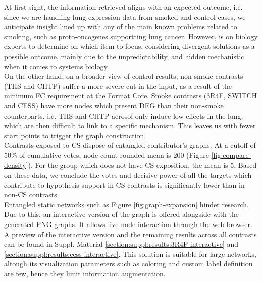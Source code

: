 At first sight, the information retrieved aligns with an expected outcome, i.e. since we are handling lung expression data from smoked and control cases, we anticipate insight lined up with any of the main known problems related to smoking, such as proto-oncogenes supportting lung cancer. However, is on biology experts to determine on which item to focus, considering divergent solutions as a possible outcome, mainly due to the unpredictability, and hidden mechanistic when it comes to systems biology.
\\

On the other hand, on a broader view of control results, non-smoke contrasts (THS and  CHTP) suffer a more severe cut in the input, as a result of the minimum FC requirement at the Format Core. Smoke contrasts (3R4F, SWITCH and CESS) have more nodes which present DEG than their non-smoke counterparts, i.e. THS and CHTP aerosol only induce low effects in the lung, which are then difficult to link to a specific mechanism. This leaves us with fewer start points to trigger the graph construction.
\\

Contrasts exposed to CS dispose of entangled contributor’s graphs. At a cutoff of 50\% of cumulative votes, node count rounded mean is 200 (Figure \ref{fig:compare-density}). For the group which does not have CS exposition, the mean is 5. Based on these data, we conclude the votes and decisive power of all the targets which contribute to hypothesis support in CS contrasts is significantly lower than in non-CS contrasts.
\\

Entangled static networks such as Figure \ref{fig:graph-expansion} hinder research. Due to this, an interactive version of the graph is offered alongside with the generated PNG graphs. It allows live node interaction through the web browser. A preview of the interactive version and the remaining results across all contrasts can be found in Suppl. Material \ref{section:suppl:results:3R4F-interactive} and \ref{section:suppl:results:cess-interactive}. This solution is suitable for large networks, altough its visualization parameters such as coloring and custom label definition are few, hence they limit information augmentation.
\\

